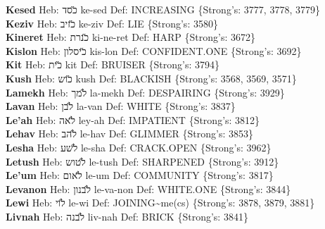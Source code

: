 {\textbf{Kesed} Heb: {\large\H כסד} ke-sed Def: INCREASING \{Strong's: 3777, 3778, 3779\}\hfill{}\\

\textbf{Keziv} Heb: {\large\H כזיב} ke-ziv Def: LIE \{Strong's: 3580\}\hfill{}\\

\textbf{Kineret} Heb: {\large\H כנרת} ki-ne-ret Def: HARP \{Strong's: 3672\}\hfill{}\\

\textbf{Kislon} Heb: {\large\H כיסלון} kis-lon Def: CONFIDENT.ONE \{Strong's: 3692\}\hfill{}\\

\textbf{Kit} Heb: {\large\H כית} kit Def: BRUISER \{Strong's: 3794\}\hfill{}\\

\textbf{Kush} Heb: {\large\H כוש} kush Def: BLACKISH \{Strong's: 3568, 3569, 3571\}\hfill{}\\

\textbf{Lamekh} Heb: {\large\H למך} la-mekh Def: DESPAIRING \{Strong's: 3929\}\hfill{}\\

\textbf{Lavan} Heb: {\large\H לבן} la-van Def: WHITE \{Strong's: 3837\}\hfill{}\\

\textbf{Le'ah} Heb: {\large\H לאה} ley-ah Def: IMPATIENT \{Strong's: 3812\}\hfill{}\\

\textbf{Lehav} Heb: {\large\H להב} le-hav Def: GLIMMER \{Strong's: 3853\}\hfill{}\\

\textbf{Lesha} Heb: {\large\H לשע} le-sha Def: CRACK.OPEN \{Strong's: 3962\}\hfill{}\\

\textbf{Letush} Heb: {\large\H לטוש} le-tush Def: SHARPENED \{Strong's: 3912\}\hfill{}\\

\textbf{Le'um} Heb: {\large\H לאום} le-um Def: COMMUNITY \{Strong's: 3817\}\hfill{}\\

\textbf{Levanon} Heb: {\large\H לבנון} le-va-non Def: WHITE.ONE \{Strong's: 3844\}\hfill{}\\

\textbf{Lewi} Heb: {\large\H לוי} le-wi Def: JOINING\textasciitilde{}me(cs) \{Strong's: 3878, 3879, 3881\}\hfill{}\\

\textbf{Livnah} Heb: {\large\H לבנה} liv-nah Def: BRICK \{Strong's: 3841\}\hfill{}\\

}
